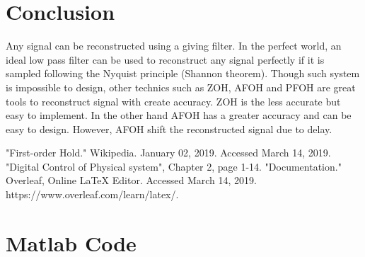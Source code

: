 \documentclass[12pt,letterpaper]{article}
\begin{document}
\section*{Conclusion}
Any signal can be reconstructed using a giving filter. In the perfect world, an ideal low pass
filter can be used to reconstruct any signal perfectly if it is sampled
following the Nyquist principle (Shannon theorem). Though such system
is impossible to design, other technics such as ZOH, AFOH and PFOH 
are great tools to reconstruct signal with create accuracy. ZOH is the less
accurate but easy to implement. In the other hand AFOH has a greater accuracy and can be easy to design. However, AFOH shift the 
reconstructed signal due to delay.
\appendix
\begin{thebibliography}{9}
"First-order Hold." Wikipedia. January 02, 2019. Accessed March 14, 2019. 
"Digital Control of Physical system", Chapter 2, page 1-14.
"Documentation." Overleaf, Online LaTeX Editor. Accessed March 14, 2019. https://www.overleaf.com/learn/latex/.
\end{thebibliography}

\section*{Matlab Code}


\end{document}

